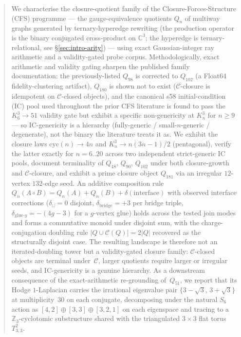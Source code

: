 \documentclass[12pt,a4paper]{article}
\theoremstyle{definition}
\theoremstyle{remark}
\newcommand{\bZ}{\mathbb{Z}}
\newcommand{\Kn}{K_n^3}
\newcommand{\Qn}{Q_n}
\newcommand{\Ccls}{\mathcal{C}}             %
\newcommand{\cyc}{\mathrm{cyc}}
\begin{document}
\begin{abstract}
\noindent
We characterise the closure-quotient family of the Closure-Forces-Structure
(CFS) programme --- the gauge-equivalence quotients $\Qn$ of multiway graphs
generated by ternary-hyperedge rewriting (the production operator is the
binary conjugated cross-product on $\mathbb{C}^3$; the hyperedge is
ternary-relational, see \S\ref{sec:intro-arity}) --- using exact
Gaussian-integer ray arithmetic and a validity-gated probe corpus. Methodologically, exact
arithmetic and validity gating sharpen the published family documentation:
the previously-listed $Q_{98}$ is corrected to $Q_{102}$ (a Float64
fidelity-clustering artifact), $Q_{180}$ is shown not to exist
($\Ccls$-closure is idempotent on $\Ccls$-closed objects), and the canonical
s58 initial-condition (IC) pool used throughout the prior CFS literature
is found to pass the $K_6^3 \to 51$ validity gate but exhibit a specific
non-genericity at $\Kn$ for $n \ge 9$ --- so IC-genericity is a hierarchy
(fully-generic / small-$n$-generic / degenerate), not the binary the
literature treats it as. We exhibit the closure laws $\cyc(n) \to 4n$ and
$\Kn \to n(3n{-}1)/2$ (pentagonal), verify the latter exactly for $n=6..20$
across two independent strict-generic IC pools, document terminality of
$Q_{48}$, $Q_{90}$, $Q_{102}$ under both closure-growth and $\Ccls$-closure,
and exhibit a prime closure object $Q_{181}$ via an irregular $12$-vertex
$132$-edge seed. An additive composition rule
$\Qn(A \circ B) = \Qn(A) + \Qn(B) + \delta(\text{interface})$
with observed interface corrections ($\delta_{\sqcup} = 0$ disjoint,
$\delta_{\text{bridge}} = +3$ per bridge triple,
$\delta_{\text{glue-}g} = -(4g-3)$ for a $g$-vertex glue) holds across
the tested join modes and forms a commutative monoid under disjoint sum,
with the charge-conjugation doubling rule $|Q \cup \Ccls(Q)| = 2|Q|$
recovered as the structurally disjoint case. The resulting landscape is
therefore not an iterated-doubling tower but a validity-gated closure
family: $\Ccls$-closed objects are terminal under~$\Ccls$, larger
quotients require larger or irregular seeds, and IC-genericity is a
genuine hierarchy. As a downstream consequence of the exact-arithmetic
re-grounding of~$Q_{51}$, we report that its Hodge $1$-Laplacian carries
the irrational eigenvalue pair $\{3{-}\sqrt 3,\,3{+}\sqrt 3\}$ at
multiplicity~$30$ on each conjugate, decomposing under the natural $S_6$
action as $[4,2] \oplus [3,3] \oplus [3,2,1]$ on each eigenspace and
tracing to a $\bZ_3$-cyclotomic substructure shared with the triangulated
$3{\times}3$ flat torus~$T^2_{3,3}$.


\end{abstract}
\end{document}
